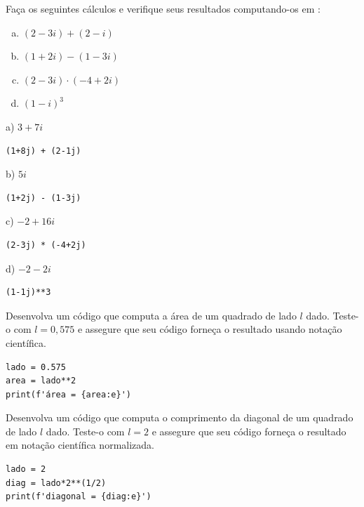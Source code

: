 \begin{exer}
  Faça os seguintes cálculos e verifique seus resultados computando-os em {\python}:
  \begin{enumerate}[a)]
  \item $(2-3i) + (2-i)$
  \item $(1+2i) - (1-3i)$
  \item $(2-3i) \cdot (-4+2i)$
  \item $(1-i)^3$
  \end{enumerate}
\end{exer}
\begin{resp}
  a) $3+7i$

\begin{lstlisting}
(1+8j) + (2-1j)
\end{lstlisting}

  b) $5i$

\begin{lstlisting}
(1+2j) - (1-3j)
\end{lstlisting}

  c) $-2+16i$

\begin{lstlisting}
(2-3j) * (-4+2j)
\end{lstlisting}

  d) $-2-2i$

\begin{lstlisting}
(1-1j)**3
\end{lstlisting}

\end{resp}


\begin{exer}
  Desenvolva um código {\python} que computa a área de um quadrado de lado $l$ dado. Teste-o com $l=0,575$ e assegure que seu código forneça o resultado usando notação científica.
\end{exer}
\begin{resp}

\begin{lstlisting}
lado = 0.575
area = lado**2
print(f'área = {area:e}')
\end{lstlisting}

\end{resp}

\begin{exer}
  Desenvolva um código {\python} que computa o comprimento da diagonal de um quadrado de lado $l$ dado. Teste-o com $l=2$ e assegure que seu código forneça o resultado em notação científica normalizada.
\end{exer}
\begin{resp}

\begin{lstlisting}
lado = 2
diag = lado*2**(1/2)
print(f'diagonal = {diag:e}')
\end{lstlisting}

\end{resp}


